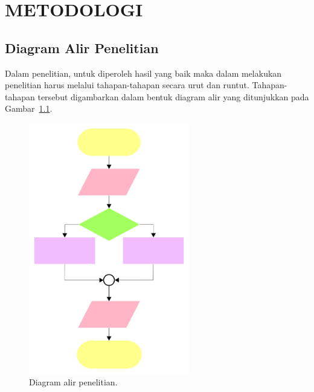\renewcommand{\thechapter}{\Roman{chapter}}
\chapter{METODOLOGI}
\renewcommand{\thechapter}{\arabic{chapter}}

\section{Diagram Alir Penelitian}

Dalam penelitian, untuk diperoleh hasil yang baik maka dalam melakukan penelitian harus melalui tahapan-tahapan secara urut dan runtut. Tahapan-tahapan tersebut digambarkan dalam bentuk diagram alir yang ditunjukkan pada Gambar~\ref{fig:diagramAlirPenelitian}.

\begin{figure}
    \centering
    \includegraphics[width=7cm]{./gambar/flowchart.png}
    \caption{Diagram alir penelitian.}
    \label{fig:diagramAlirPenelitian}
\end{figure}


